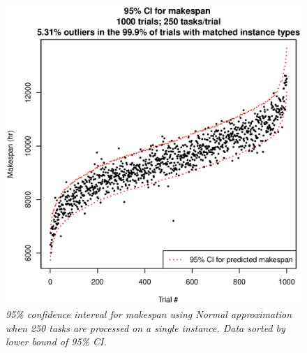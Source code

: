 \documentclass[12pt]{report}
\begin{document}
\begin{figure}
\includegraphics[width=1\textwidth]{validate-stochastic-runtimes-1000-trials-250-tasks.eps}
\caption{\textit{95\% confidence interval for makespan using Normal approximation when 250 tasks are processed on a single instance. Data sorted by lower bound of 95\% CI.}}
\label{fig:validate-stochastic-runtimes-1000-trials-250-tasks}
\end{figure}
\end{document}
